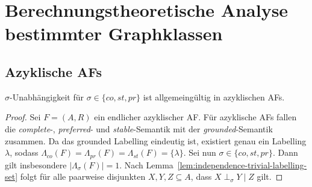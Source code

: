 \chapter{Berechnungstheoretische Analyse bestimmter Graphklassen}
\label{ch:graphclasses}

\section{Azyklische AFs}
\label{sec:acyc-afs}

\begin{Proposition}
\label{prop:acyc-af-ci-st-top}
    \(\sigma\)-Unabhängigkeit für \(\sigma \in \{co,st,pr\}\) ist allgemeingültig in azyklischen AFs.
\end{Proposition}

\begin{proof}
\label{pr:acyc-af-ci-st-top-true}
    Sei \(F=(A,R)\) ein endlicher azyklischer AF. Für azyklische AFs fallen die \emph{complete}-, \emph{preferred}- und \emph{stable}-Semantik mit der \emph{grounded}-Semantik zusammen. 
    Da das grounded Labelling eindeutig ist, existiert genau ein Labelling \(\lambda\), sodass \(\Lambda_{co}(F)=\Lambda_{pr}(F)=\Lambda_{st}(F)=\{\lambda\}\).
    Sei nun \(\sigma \in \{co,st,pr\}\). Dann gilt insbesondere \(|\Lambda_\sigma(F)|=1\). Nach Lemma~\ref{lem:independence-trivial-labelling-set} folgt für alle paarweise disjunkten \(X,Y,Z \subseteq A\), 
    dass \(X \perp_\sigma Y \mid Z\) gilt.
\end{proof}

